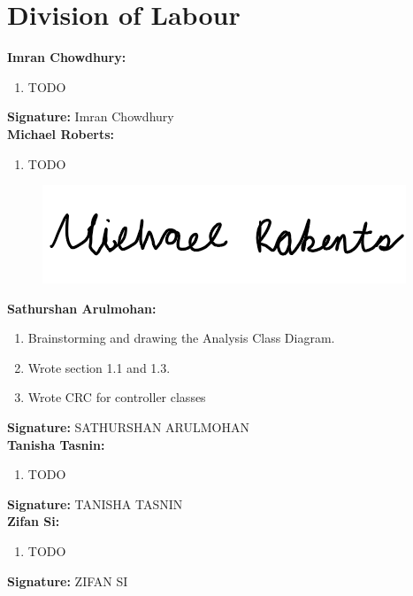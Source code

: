 \documentclass[]{article}
\begin{document}

\appendix
\section{Division of Labour}
\label{sec:division_of_labour}
\textbf{Imran Chowdhury:}
\begin{enumerate}
	\item TODO
\end{enumerate}

\textbf{Signature:} Imran Chowdhury \\

\textbf{Michael Roberts:}
\begin{enumerate}
	\item TODO
\end{enumerate}

\begin{figure}[H]
 	\centering
    \includegraphics[width=\textwidth]{image/A_Michael_Roberts_Signature.png}
\end{figure}

\textbf{Sathurshan Arulmohan:}
\begin{enumerate}
	\item Brainstorming and drawing the Analysis Class Diagram.
	\item Wrote section 1.1 and 1.3.
	\item Wrote CRC for controller classes
\end{enumerate}

\textbf{Signature:} SATHURSHAN ARULMOHAN \\

\textbf{Tanisha Tasnin:}
\begin{enumerate}
	\item TODO
\end{enumerate}

\textbf{Signature:} TANISHA TASNIN \\

\textbf{Zifan Si:}
\begin{enumerate}
	\item TODO
\end{enumerate}

\textbf{Signature:} ZIFAN SI  \\
\end{document}
